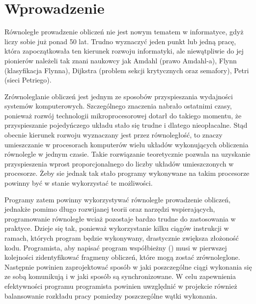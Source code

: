 
\chapter*{Wprowadzenie}

  Równoległe prowadzenie obliczeń nie jest nowym tematem w informatyce, gdyż liczy sobie już ponad 50 lat\cite{parhist}.
  Trudno wyznaczyć jeden punkt lub jedną pracę, która zapoczątkowała ten kierunek rozwoju informatyki, ale niewątpliwie do jej pionierów należeli tak znani naukowcy jak
  Amdahl (prawo Amdahl-a), Flynn (klasyfikacja Flynna), Dijkstra (problem sekcji krytycznych oraz semafory), Petri (sieci Petriego).
  
  Zrównoleglanie obliczeń jest jednym ze sposobów przyspieszania wydajności systemów komputerowych.
  Szczególnego znaczenia nabrało ostatnimi czasy, ponieważ rozwój technologii mikroprocesorowej dotarł do takiego momentu, że przyspieszanie pojedyńczego układu stało się trudne i dlatego nieopłacalne.
  Stąd obecnie kierunek rozwoju wyznaczany jest przez równoległość, to znaczy umieszczanie w procesorach komputerów wielu układów wykonujących obliczenia równolegle w jednym czasie.
  Takie rozwiązanie teoretycznie pozwala na uzyskanie przyspieszenia wprost proporcjonalnego do liczby układów umieszczonych w procesorze.
  Żeby sie jednak tak stało programy wykonywane na takim procesorze powinny być w stanie wykorzystać te możliwości.
  
  Programy zatem powinny wykorzystywać równoległe prowadzenie obliczeń, jednakże pomimo długo rozwijanej teorii oraz narzędzi wspierających, programowanie równoległe wciaż pozostaje bardzo trudne do zastosowania w praktyce.
  Dzieje się tak, ponieważ wykorzystanie kilku ciągów instrukcji w ramach, których program będzie wykonywany, drastycznie zwiększa złożoność kodu.
  Programista, aby napisać program współbieżny (\cite{barney}) musi w pierwszej kolejności zidentyfikować fragmeny obliczeń, które mogą zostać zrównoleglone.
  Następnie powinien zaprojektować sposób w jaki poszczególne ciągi wykonania się ze sobą komunikują i w jaki sposób są synchronizowane.
  W celu zapewnienia efektywności programu programista powinien uwzględnić w projekcie również balansowanie rozkładu pracy pomiedzy poszczególne wątki wykonania.
  
